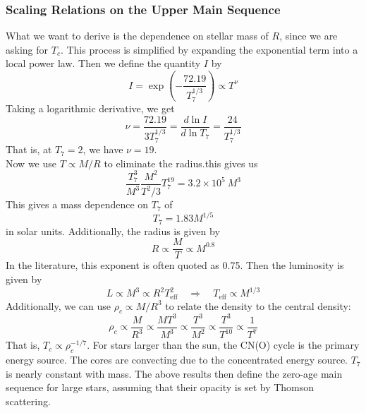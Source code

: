 \documentclass[10pt]{article}
\numberwithin{equation}{section}
\newcommand{\n}{\noindent}
\begin{document}
    \subsubsection{Scaling Relations on the Upper Main Sequence}
    \label{sec:scal-relat-upper}

    What we want to derive is
    the dependence on stellar mass of $R$, since we are asking for
    $T_c$. This process is simplified by expanding the exponential
    term into a local power law. Then we define the quantity $I$ by
    \begin{equation}
      \label{eq:180}
      I=\exp\left(-\frac{72.19}{T_7^{1/3}}\right)\propto T^\nu
    \end{equation}
    Taking a logarithmic derivative, we get
    \begin{equation}
      \label{eq:181}
      \nu=\frac{72.19}{3T_7^{1/3}}=\frac{d\ln I}{d\ln T_7}=\frac{24}{T_7^
{1/3}}
    \end{equation}
    That is, at $T_7=2$, we have $\nu=19$.\\

    \n Now we use $T\propto M/R$ to eliminate the radius.this gives us
    \begin{equation}
      \label{eq:182}
      \frac{T_7^3}{M^3}\frac{M^2}{T^2/3}T_7^{19}=3.2\times 10^5\ M^3
    \end{equation}
    This gives a mass dependence on $T_7$ of
    \begin{equation}
      \label{eq:183}
      \boxed{T_7=1.83 M^{1/5}}
    \end{equation}
    in solar units. Additionally, the radius is given by
    \begin{equation}
      \label{eq:184}
      R\propto \frac{M}{T}\propto M^{0.8}
    \end{equation}
    In the literature, this exponent is often quoted as
    0.75. Then the luminosity is given by
    \begin{equation}
      \label{eq:185}
      L\propto M^3\propto R^2T_{\mathrm{eff}}^2\quad\Rightarrow\quad
      T_{\mathrm{eff}}\propto M^{1/3}
    \end{equation}
    Additionally, we can use $\rho_c\propto M/R^3$ to relate the
    density to the central density:
    \begin{equation}
      \label{eq:186}
      \rho_c\propto \frac{M}{R^3}\propto \frac{M T^3}{M^3}\propto
      \frac{T^3}{M^2}\propto \frac{T^3}{T^{10}}\propto \frac{1}{T^7}
    \end{equation}
    That is, $T_c\propto \rho_c^{-1/7}$. For stars larger than the
    sun, the CN(O) cycle is the primary energy source. The cores are
    convecting due to the concentrated energy source. $T_7$ is nearly
    constant with mass. The above results then define the zero-age
    main sequence for large stars, assuming that their opacity is set
    by Thomson scattering.
\end{document}
